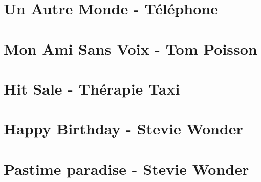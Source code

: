 \documentclass{guitartabs}
\begin{document}
\section*{Un Autre Monde - Téléphone}
\begin{guitar}

\end{guitar}


\section*{Mon Ami Sans Voix - Tom Poisson}
\begin{guitar}

\end{guitar}

\section{Hit Sale - Thérapie Taxi}
\begin{guitar}

\end{guitar}

\section{Happy Birthday - Stevie Wonder}
\begin{guitar}

\end{guitar}



\section{Pastime paradise - Stevie Wonder}
\begin{guitar}

\end{guitar}
\end{document}
